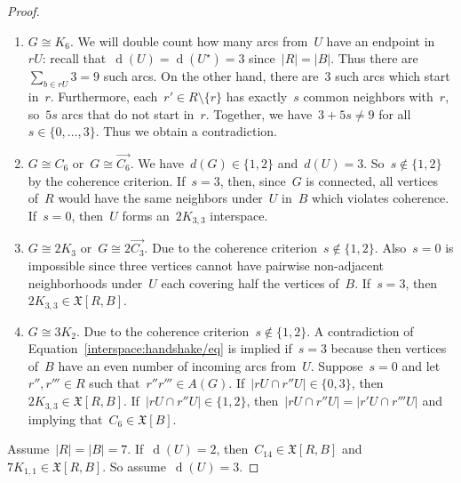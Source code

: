\documentclass[english,a4paper]{article}
\theoremstyle{plain}
\theoremstyle{definition}
\newcommand{\abs}[1]{| #1 |}
\newcommand{\coherentConfig}{\ensuremath{\mathfrak{X}}}
\newcommand{\interspace}[2]{\ensuremath{\coherentConfig[#1,#2]}}
\newcommand{\inducedCC}[1]{\ensuremath{\coherentConfig[#1]}}
\newcommand{\intDegree}[1]{\ensuremath{\Deg \left( #1 \right)}}
\newcommand{\arcs}{\ensuremath{A}}
\DeclareMathOperator{\Deg}{d}
\newcommand{\matchingCC}[1]{\ensuremath{\disjointCliques{#1}{2}}}
\newcommand{\clique}[1]{\ensuremath{K_{#1}}}
\newcommand{\cycle}[1]{\ensuremath{C_{#1}}}
\newcommand{\disjointCliques}[2]{\ensuremath{#1 \clique{#2}}}
\newcommand{\matching}[1]{\ensuremath{#1 K_{1,1}}}
\begin{document}
\begin{proof}
    \begin{enumerate}[label=(\arabic*)]
        \item
        $G \cong \clique{6}$.
        We will double count how many arcs from~$U$ have an endpoint in~$rU$:
        recall that~$\intDegree{U} = \intDegree{U^\star} = 3$ since~$\abs{R} = \abs{B}$.
        Thus there are~$\sum_{b \in rU} 3 = 9$ such arcs.
        On the other hand, there are~$3$ such arcs which start in~$r$.
        Furthermore, each~$r' \in R\setminus\{r\}$ has exactly~$s$ common neighbors with~$r$, so~$5s$ arcs that do not start in~$r$.
        Together, we have~$3+5s \neq 9$ for all~$s \in \{0,\dots,3\}$.
        Thus we obtain a contradiction.

        \item
        $G \cong \cycle{6}$ or~$G \cong \overrightarrow{C_6}$.
        We have~$d(G)\in \{1,2\}$ and~$d(U)=3$. So~$s\notin \{1,2\}$ by the coherence criterion. If~$s=3$, then, since~$G$ is connected, all vertices of~$R$ would have the same neighbors under~$U$ in~$B$ which violates coherence. If~$s=0$, then~$U$ forms an~$\disjointCliques{2}{3,3}$ interspace.

        \item
        $G \cong \disjointCliques{2}{3}$ or~$G \cong 2\overrightarrow{\cycle{3}}$.
        Due to the coherence criterion~$s \notin \{1,2\}$.
        Also~$s=0$ is impossible since three vertices cannot have pairwise non-adjacent neighborhoods under~$U$ each covering half the vertices of~$B$.
        If~$s = 3$, then~$\disjointCliques{2}{3,3} \in \interspace{R}{B}$.

        \item
        $G \cong \matchingCC{3}$. Due to the coherence criterion~$s\notin \{1,2\}$.
        A contradiction of Equation~\eqref{interspace:handshake/eq} is implied if~$s = 3$ because then vertices of~$B$ have an even number of incoming arcs from~$U$.
        Suppose~$s = 0$ and let~$r'',r''' \in R$ such that~$r''r''' \in \arcs(G)$.
        If~$\abs{r U \cap r''U} \in \{0,3\}$, then~$\disjointCliques{2}{3,3} \in \interspace{R}{B}$.
        If~$\abs{r U \cap r''U} \in \{1,2\}$, then~$\abs{r U \cap r''U} = \abs{r' U \cap r'''U}$ and implying that~$\cycle{6} \in \inducedCC{B}$.
    \end{enumerate}

    Assume~$\abs{R} = \abs{B} = 7$.
    If~$\intDegree{U} = 2$, then~$\cycle{14} \in \interspace{R}{B}$ and~$\matching{7} \in \interspace{R}{B}$.
    So assume~$\intDegree{U} = 3$.


\end{proof}
\end{document}
